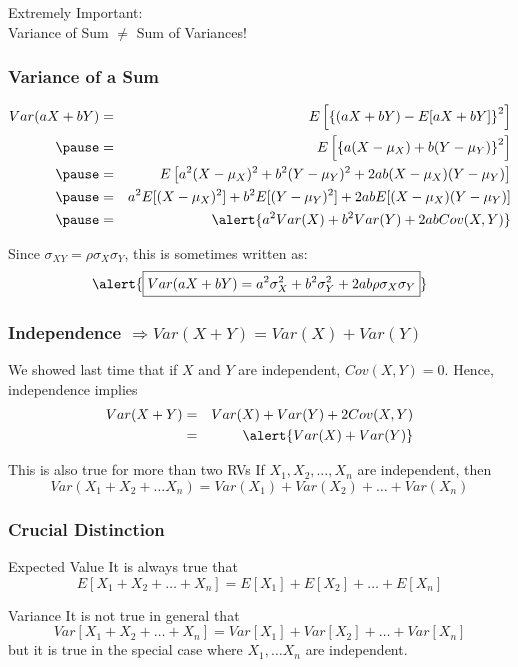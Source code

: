 \documentclass[handout]{beamer}
\begin{document}
\begin{frame}
\huge
Extremely Important:\\
\vspace{1em}
\alert{Variance of Sum $\neq$ Sum of Variances!}
\end{frame}
\begin{frame}
\frametitle{Variance of a Sum}
\footnotesize
\begin{eqnarray*}
	Var(aX + bY) &=& E\left[\left\{\left( aX + bY\right) - E[aX + bY]\right\}^2  \right]\\ \pause
	&=& E\left[  \left\{a (X - \mu_X) + b(Y - \mu_Y)\right\}^2 \right]\\ \pause
	&=& E\left[a^2(X-\mu_X)^2 + b^2(Y-\mu_Y)^2 + 2ab(X-\mu_X)(Y-\mu_Y)  \right]\\ \pause
	&=&a^2E[(X-\mu_X)^2] + b^2 E[(Y-\mu_Y)^2] + 2ab E[(X-\mu_X)(Y-\mu_Y)]\\ \pause
	&=& \alert{a^2 Var(X) + b^2 Var(Y) + 2ab Cov(X,Y)}
\end{eqnarray*}


\vspace{3em}
\normalsize
Since $\sigma_{XY} = \rho\sigma_X \sigma_Y$, this is sometimes written as:
$$\alert{\boxed{Var(aX + bY) = a^2 \sigma_X^2 + b^2 \sigma_Y^2 + 2ab \rho \sigma_X \sigma_Y}}$$
\end{frame}
\begin{frame}
\frametitle{Independence $\Rightarrow Var(X+Y) = Var(X) + Var(Y)$}

We showed last time that if $X$ and $Y$ are independent, $Cov(X,Y)=0$. Hence, independence implies
\begin{eqnarray*}
	Var(X + Y) &=& Var(X) + Var(Y) + 2 Cov(X,Y)\\
			&=& \alert{Var(X) +Var(Y)}
\end{eqnarray*}


\begin{block}{This is also true for more than two RVs}
If $X_1, X_2, \hdots, X_n$ are independent, then
	$$Var(X_1 + X_2 + \hdots X_n) = Var(X_1) + Var(X_2) + \hdots + Var(X_n)$$
\end{block}

\end{frame}
\begin{frame}
\frametitle{Crucial Distinction}
\begin{block}{Expected Value}
It is \alert{always} true that
	$$E[X_1 + X_2 + \hdots + X_n] = E[X_1] + E[X_2] + \hdots + E[X_n]$$
\end{block}


\begin{block}{Variance}
It is \alert{not true in general} that 
	$$Var[X_1 + X_2 + \hdots + X_n] = Var[X_1] + Var[X_2] + \hdots + Var[X_n]$$
but it \alert{is true} in the special case where $X_1, \hdots X_n$ are independent.
\end{block}
\end{frame}
\end{document}
